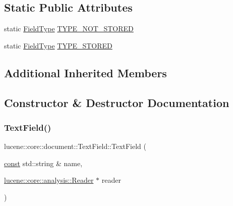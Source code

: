 \subsection*{Static Public Attributes}
\begin{DoxyCompactItemize}
\item 
static \mbox{\hyperlink{classlucene_1_1core_1_1document_1_1FieldType}{Field\+Type}} \mbox{\hyperlink{classlucene_1_1core_1_1document_1_1TextField_a1e2da64d8301a994afab6f2866fc1240}{T\+Y\+P\+E\+\_\+\+N\+O\+T\+\_\+\+S\+T\+O\+R\+ED}}
\item 
static \mbox{\hyperlink{classlucene_1_1core_1_1document_1_1FieldType}{Field\+Type}} \mbox{\hyperlink{classlucene_1_1core_1_1document_1_1TextField_aeb382d647260b7dce955b98afe8dd0e7}{T\+Y\+P\+E\+\_\+\+S\+T\+O\+R\+ED}}
\end{DoxyCompactItemize}
\subsection*{Additional Inherited Members}


\subsection{Constructor \& Destructor Documentation}
\mbox{\label{classlucene_1_1core_1_1document_1_1TextField_a2b7a587298cd4f15df081de5ef1c868a}} 
\subsubsection{\texorpdfstring{Text\+Field()}{TextField()}\hspace{0.1cm}{\footnotesize\ttfamily [1/4]}}
{\footnotesize\ttfamily lucene\+::core\+::document\+::\+Text\+Field\+::\+Text\+Field (\begin{DoxyParamCaption}\item[{\mbox{\hyperlink{ZlibCrc32_8h_a2c212835823e3c54a8ab6d95c652660e}{const}} std\+::string \&}]{name,  }\item[{\mbox{\hyperlink{classlucene_1_1core_1_1analysis_1_1Reader}{lucene\+::core\+::analysis\+::\+Reader}} $\ast$}]{reader }\end{DoxyParamCaption})\hspace{0.3cm}{\ttfamily [inline]}}

